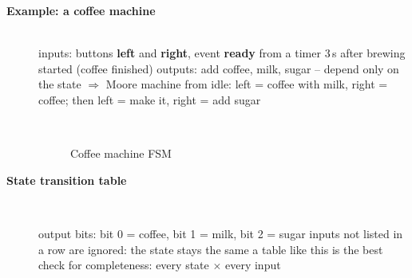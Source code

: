 \begin{description}
\item[{\rot\bf Example: a coffee machine}]~\\[-\lblskip]
\bi
	\ite inputs: buttons \textbf{left} and \textbf{right}, event \textbf{ready} from a timer 3\,s after brewing started (coffee finished)
	\ite outputs: add coffee, milk, sugar -- depend only on the state $\Rightarrow$ Moore machine
	\ite from idle: left = coffee with milk, right = coffee; then left = make it, right = add sugar
\ei
\begin{figure}[!hbtp]
     \begin{center}
	  \\
	  \caption{Coffee machine FSM}
     \end{center}
\end{figure}
\os{\newpage}

\item[{\rot\bf State transition table}]~\\[-\lblskip]
\begin{center}
\end{center}
\bi
	\ite output bits: bit 0 = coffee, bit 1 = milk, bit 2 = sugar
	\ite inputs not listed in a row are ignored: the state stays the same
	\ite a table like this is the best check for completeness: every state $\times$ every input
\ei
\os{\newpage}


\end{description}
